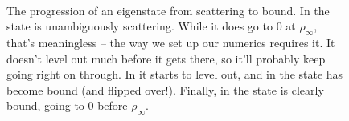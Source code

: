 \documentclass[12pt,twoside]{reedthesis}
\begin{document}
\begin{figure}
\centering {}
 \\ 
\caption[This is the box text.]{The progression of an eigenstate from scattering to bound. In 
 the state is unambiguously scattering. While it does go to 0 at $\rho_{\infty}$, that's meaningless -- the way we set up our numerics requires it. It doesn't level out much before it gets there, so it'll probably keep going right on through. In  it starts to level out, and in  the state has become bound (and flipped over!). Finally, in  the state is clearly bound, going to 0 before $\rho_{\infty}$.}%
\label{fig:scatt-to-bound}
\end{figure}
\end{document}
